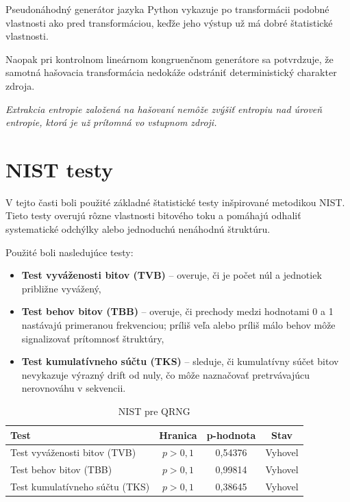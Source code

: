 Pseudonáhodný generátor jazyka Python vykazuje po transformácii podobné vlastnosti ako pred transformáciou, keďže jeho výstup už má dobré štatistické vlastnosti.

Naopak pri kontrolnom lineárnom kongruenčnom generátore sa potvrdzuje, že samotná hašovacia transformácia nedokáže odstrániť deterministický charakter zdroja.

\textit{Extrakcia entropie založená na hašovaní nemôže zvýšiť entropiu nad úroveň entropie, ktorá je už prítomná vo vstupnom zdroji.}









\section{NIST testy}


V tejto časti boli použité základné štatistické testy inšpirované metodikou NIST.
Tieto testy overujú rôzne vlastnosti bitového toku a pomáhajú odhaliť systematické odchýlky alebo jednoduchú nenáhodnú štruktúru.

Použité boli nasledujúce testy:

\begin{itemize}
  \item \textbf{Test vyváženosti bitov (TVB)} -- overuje, či je počet núl a jednotiek približne vyvážený,

  \item \textbf{Test behov bitov (TBB)} -- overuje, či prechody medzi hodnotami 0 a 1 nastávajú primeranou frekvenciou; príliš veľa alebo príliš málo behov môže signalizovať prítomnosť štruktúry,

  \item \textbf{Test kumulatívneho súčtu (TKS)} -- sleduje, či kumulatívny súčet bitov nevykazuje výrazný drift od nuly, čo môže naznačovať pretrvávajúcu nerovnováhu v sekvencii.
\end{itemize}



\begin{table}[H]
  \centering
  \caption{NIST pre QRNG}
  \label{tab:nist_qrng}
  \begin{tabular}{lccc}
    \toprule
    \textbf{Test} & \textbf{Hranica} & \textbf{p-hodnota} & \textbf{Stav} \\
    \midrule
    Test vyváženosti bitov (TVB)   & $p > 0{,}1$ & 0,54376 & Vyhovel \\
    Test behov bitov (TBB)         & $p > 0{,}1$ & 0,99814 & Vyhovel \\
    Test kumulatívneho súčtu (TKS) & $p > 0{,}1$ & 0,38645 & Vyhovel \\
    \bottomrule
  \end{tabular}

\end{table}

